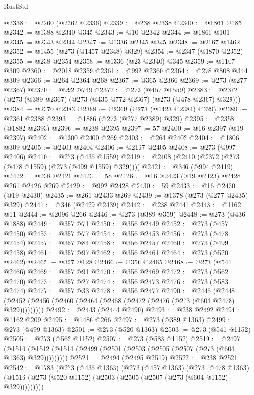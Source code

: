 \begin{lexlean}{RustStd}
\begin{coremodule}
{\begin{coremodule}
{{{{{{{{{{{{{{{{{{{{{{{{{{{{{{{{{{{{{{{{{{{{{{{{{{{{{{{{{{{{{{{{{{{{{{{{{{{{{{{{{{{{{@2338 := @2260 (@2262 @2336)
@2339 := @238 @2338
@2340 := @1861 @185
@2342 := @1388 @2340 @345
@2343 := @10 @2342
@2344 := @1861 @101
@2345 := @2343 @2344
@2347 := @1336 @2345 @345
@2348 := @2167 @1462
@2352 := @1455 (@273 (@1457 @2348) @329)
@2354 := @2347 (@1870 @2352)
@2355 := @238 @2354
@2358 := @1336 (@23 @2340) @345
@2359 := @1107 @309
@2360 := @2018 @2359
@2361 := @992 @2360
@2364 := @278 @808 @344 @309
@2366 := @264 @2364 @268
@2367 := @365 @2366
@2369 := @273 (@277 @2367)
@2370 := @992 @749
@2372 := @273 (@457 @1559)
@2383 := @2372 (@273 (@389 @2367) (@273 (@435 @772 @2367) (@273 (@478 @2367) @329)))
@2384 := @2370 @2383
@2388 := @2369 (@273 (@1423 @2384) @329)
@2389 := @2361 @2388
@2393 := @1886 (@273 (@277 @2389) @329)
@2395 := @2358 (@1882 @2393)
@2396 := @238 @2395
@2397 := 57
@2400 := @16 @2397 (@19 @2397)
@2402 := @1300 @2400 @269
@2403 := @264 @2402
@2404 := @1806 @309
@2405 := @2403 @2404
@2406 := @2167 @2405
@2408 := @273 (@997 @2406)
@2410 := @273 (@436 @1559)
@2419 := @2408 (@2410 (@2372 (@273 (@478 @1559) (@273 (@499 @1559) @329))))
@2421 := @346 (@994 @2419)
@2422 := @238 @2421
@2423 := 58
@2426 := @16 @2423 (@19 @2423)
@2428 := @261 @2426 @269
@2429 := @992 @2428
@2430 := 59
@2433 := @16 @2430 (@19 @2430)
@2435 := @261 @2433 @269
@2439 := @1378 (@273 (@277 @2435) @329)
@2441 := @346 (@2429 @2439)
@2442 := @238 @2441
@2443 := @1162 @11
@2444 := @2096 @266
@2446 := @273 (@389 @359)
@2448 := @273 (@436 @1888)
@2449 := @357 @71
@2450 := @356 @2449
@2452 := @273 (@457 @2450)
@2453 := @357 @77
@2454 := @356 @2453
@2456 := @273 (@478 @2454)
@2457 := @357 @84
@2458 := @356 @2457
@2460 := @273 (@499 @2458)
@2461 := @357 @97
@2462 := @356 @2461
@2464 := @273 (@520 @2462)
@2465 := @357 @128
@2466 := @356 @2465
@2468 := @273 (@541 @2466)
@2469 := @357 @91
@2470 := @356 @2469
@2472 := @273 (@562 @2470)
@2473 := @357 @27
@2474 := @356 @2473
@2476 := @273 (@583 @2474)
@2477 := @357 @33
@2478 := @356 @2477
@2490 := @2446
    (@2448 (@2452 (@2456 (@2460 (@2464 (@2468 (@2472 (@2476 (@273 (@604 @2478) @329)))))))))
@2492 := @2443 (@2444 @2490)
@2493 := @238 @2492
@2494 := @1162 @209
@2495 := @1486 @266
@2497 := @273 (@389 @1363)
@2499 := @273 (@499 @1363)
@2501 := @273 (@520 @1363)
@2503 := @273 (@541 @1152)
@2505 := @273 (@562 @1152)
@2507 := @273 (@583 @1152)
@2519 := @2497
    (@1510 (@1512 (@1514 (@2499 (@2501 (@2503 (@2505 (@2507 (@273 (@604 @1363) @329)))))))))
@2521 := @2494 (@2495 @2519)
@2522 := @238 @2521
@2542 := @1783
    (@273
      (@436 @1363)
      (@273
        (@457 @1363)
        (@273
          (@478 @1363)
          (@1516 (@273 (@520 @1152) (@2503 (@2505 (@2507 (@273 (@604 @1152) @329)))))))))
}}}}}}}}}}}}}}}}}}}}}}}}}}}}}}}}}}}}}}}}}}}}}}}}}}}}}}}}}}}}}}}}}}}}}}}}}}}}}}}}}}}}}
\end{coremodule}}
\end{coremodule}
\end{lexlean}
